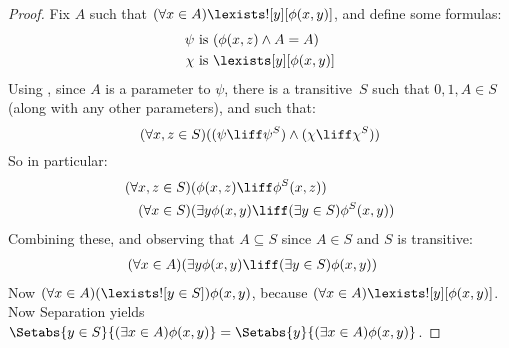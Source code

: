 \documentclass[../../../include/open-logic-section]{subfiles}
\begin{document}
\begin{proof}
Fix $A$ such that $(\forall x \in A)\lexists![y][\phi(x,y)]$, and
define some formulas:
\begin{align*}
	\psi &\text{ is } (\phi(x, z) \land A = A)\\
	\chi &\text{ is } \lexists[y][\phi(x, y)]
\end{align*}
Using , since $A$ is a parameter to $\psi$, there
is a transitive~$S$ such that $0, 1, A \in S$  (along with any other
parameters), and such that:
\[
	(\forall x,z \in S)((\psi \liff \psi^S) \land (\chi \liff \chi^S))
\]
So in particular:
\begin{align*}
	(\forall  x, z \in S)(&\phi(x, z) \liff \phi^S(x, z))\\
	(\forall x \in S)(&\exists y\phi(x, y) \liff (\exists y \in S)\phi^S(x, y)) 
\end{align*}
Combining these, and observing that $A \subseteq S$ since $A \in S$ and $S$ is transitive:
\begin{align*}
	(\forall x \in A)(&\exists y\phi(x, y) \liff (\exists y \in S)\phi(x, y))
\end{align*}
Now $(\forall x \in A)(\lexists![y \in S])\phi(x, y)$, because
$(\forall x \in A)\lexists![y][\phi(x, y)]$. Now Separation yields
$\Setabs{y \in S}{(\exists x \in A) \phi(x, y)} = \Setabs{y}{(\exists
x \in A) \phi(x, y)}$. 
\end{proof}

\end{document}
